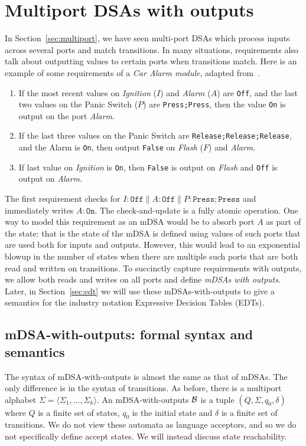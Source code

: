 \section{Multiport DSAs with outputs}
\label{sec:multiport-outputs}

In Section~\ref{sec:multiport}, we have seen multi-port DSAs which process inputs across several ports and match transitions. In many situations, requirements also talk about outputting values to certain ports when transitions match. Here is an example of some requirements of a \emph{Car Alarm module}, adapted from~\cite{DBLP:conf/enase/VenkateshSZA15a}. 
\begin{enumerate}
\item If the most recent values on \emph{Ignition} ($I$) and \emph{Alarm} ($A$) are \texttt{Off}, and the last two values on the Panic Switch ($P$) are \texttt{Press;Press}, then the value \texttt{On} is output on the port \emph{Alarm}.

\item If the last three values on the Panic Switch are \texttt{Release;Release;Release}, and the Alarm is \texttt{On}, then output \texttt{False} on \emph{Flash} ($F$)
and \emph{Alarm}.

\item If last value on \emph{Ignition} is \texttt{On}, then \texttt{False} is output on \emph{Flash} and \texttt{Off} is output on \emph{Alarm}.
\end{enumerate}

The first requirement checks for $I:\mathtt{Off} \parallel A:\mathtt{Off} \parallel P:\mathtt{Press;Press}$ and immediately writes $A: \mathtt{On}$. The check-and-update is a fully atomic operation. One way to model this requirement as an mDSA would be to absorb port $A$ as part of the state: that is the state of the mDSA is defined using values of such ports that are used both for inputs and outputs. However, this would lead to an exponential blowup in the number of states when there are multiple such ports that are both read and written on transitions. To succinctly capture requirements with outputs, we allow both reads and writes on all ports and define \emph{mDSAs with outputs}. Later, in Section~\ref{sec:edt} we will use these mDSAs-with-outputs to give a semantics for the industry notation Expressive Decision Tables (EDTs).

\subsection{mDSA-with-outputs: formal syntax and semantics}
\label{sec:mdsao-synt}
The syntax of mDSA-with-outputs is almost the same as that of mDSAs. The only difference is in the syntax of transitions.  As before, there is a multiport alphabet $\Sigma = \langle \Sigma_1, \dots, \Sigma_k \rangle$. An mDSA-with-outputs $\mathcal{B}$ is a tuple $(Q, \Sigma, q_0, \delta)$ where $Q$ is a finite set of states, $q_0$ is the initial state and $\delta$ is a finite set of transitions. We do not view these automata as language acceptors, and so we do not specifically define accept states. We will instead discuss  state reachability. 

